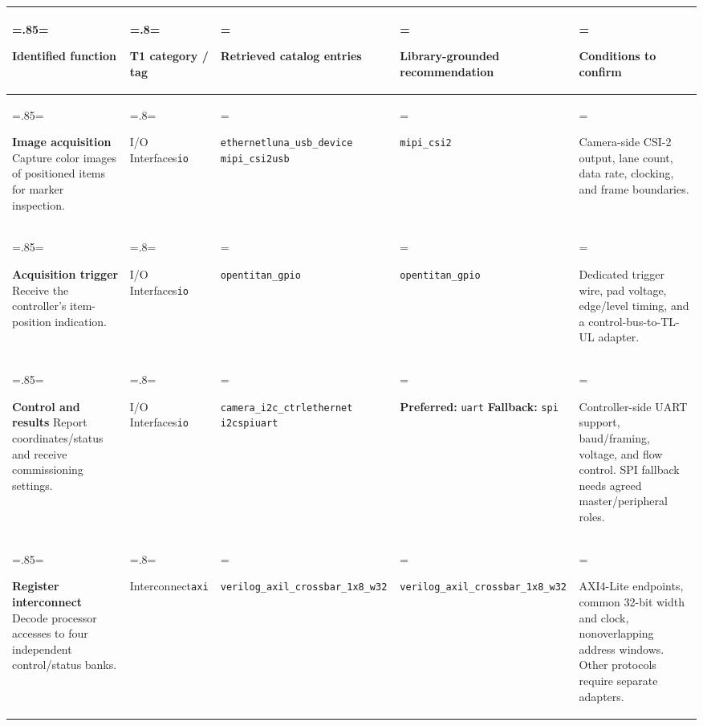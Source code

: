 \begin{tabularx}{\linewidth}{@{}
  >{\hsize=.85\hsize\linewidth=\hsize\raggedright\arraybackslash}X
  >{\hsize=.8\hsize\linewidth=\hsize\raggedright\arraybackslash}X
  >{\hsize=1.05\hsize\linewidth=\hsize\raggedright\arraybackslash}X
  >{\hsize=1.0\hsize\linewidth=\hsize\raggedright\arraybackslash}X
  >{\hsize=1.3\hsize\linewidth=\hsize\raggedright\arraybackslash}X@{}}
\toprule
\textbf{Identified function} &
\textbf{T1 category / tag} &
\textbf{Retrieved catalog entries} &
\textbf{Library-grounded recommendation} &
\textbf{Conditions to confirm} \\
\midrule
\textbf{Image acquisition}\newline
Capture color images of positioned items for marker inspection.
& I/O Interfaces\newline \texttt{io}
& \texttt{ethernet}\newline \texttt{luna\_usb\_device}\newline
  \texttt{mipi\_csi2}\newline \texttt{usb}
& \texttt{mipi\_csi2}
& Camera-side CSI-2 output, lane count, data rate, clocking, and frame boundaries. \\
\midrule
\textbf{Acquisition trigger}\newline
Receive the controller's item-position indication.
& I/O Interfaces\newline \texttt{io}
& \texttt{opentitan\_gpio}
& \texttt{opentitan\_gpio}
& Dedicated trigger wire, pad voltage, edge/level timing, and a control-bus-to-TL-UL adapter. \\
\midrule
\textbf{Control and results}\newline
Report coordinates/status and receive commissioning settings.
& I/O Interfaces\newline \texttt{io}
& \texttt{camera\_i2c\_ctrl}\newline \texttt{ethernet}\newline
  \texttt{i2c}\newline \texttt{spi}\newline \texttt{uart}
& \textbf{Preferred:} \texttt{uart}\newline
  \textbf{Fallback:} \texttt{spi}
& Controller-side UART support, baud/framing, voltage, and flow control. SPI fallback needs agreed master/peripheral roles. \\
\midrule
\textbf{Register interconnect}\newline
Decode processor accesses to four independent control/status banks.
& Interconnect\newline \texttt{axi}
& \texttt{verilog\_axil\_}\newline \texttt{crossbar\_1x8\_w32}
& \texttt{verilog\_axil\_}\newline \texttt{crossbar\_1x8\_w32}
& AXI4-Lite endpoints, common 32-bit width and clock, nonoverlapping address windows. Other protocols require separate adapters. \\
\bottomrule
\end{tabularx}
\endgroup

